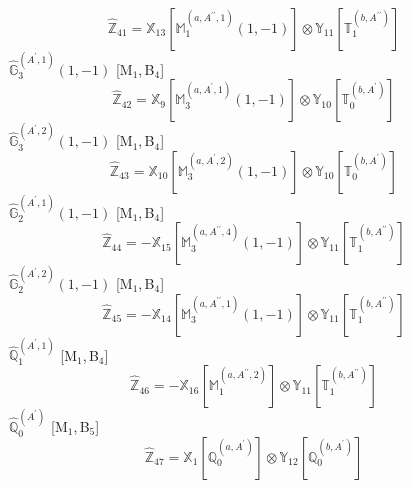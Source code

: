 \documentclass[fleqn,10pt,landscape]{article}
\begin{document}
\begin{itemize}
\begin{dmath*}
\hat{\mathbb{Z}}_{41}=\mathbb{X}_{13}[\mathbb{M}_{1}^{(a,A^{\prime\prime},1)}(1,-1)] \otimes\mathbb{Y}_{11}[\mathbb{T}_{1}^{(b,A^{\prime\prime})}]
\end{dmath*}
\vspace{4mm}
\noindent {} $\,\,\,\hat{\mathbb{G}}_{3}^{(A^{\prime},1)}(1,-1)$ [M$_{1}$,\,B$_{4}$]
\begin{dmath*}
\hat{\mathbb{Z}}_{42}=\mathbb{X}_{9}[\mathbb{M}_{3}^{(a,A^{\prime},1)}(1,-1)] \otimes\mathbb{Y}_{10}[\mathbb{T}_{0}^{(b,A^{\prime})}]
\end{dmath*}
\vspace{4mm}
\noindent {} $\,\,\,\hat{\mathbb{G}}_{3}^{(A^{\prime},2)}(1,-1)$ [M$_{1}$,\,B$_{4}$]
\begin{dmath*}
\hat{\mathbb{Z}}_{43}=\mathbb{X}_{10}[\mathbb{M}_{3}^{(a,A^{\prime},2)}(1,-1)] \otimes\mathbb{Y}_{10}[\mathbb{T}_{0}^{(b,A^{\prime})}]
\end{dmath*}
\vspace{4mm}
\noindent {} $\,\,\,\hat{\mathbb{G}}_{2}^{(A^{\prime},1)}(1,-1)$ [M$_{1}$,\,B$_{4}$]
\begin{dmath*}
\hat{\mathbb{Z}}_{44}=- \mathbb{X}_{15}[\mathbb{M}_{3}^{(a,A^{\prime\prime},4)}(1,-1)] \otimes\mathbb{Y}_{11}[\mathbb{T}_{1}^{(b,A^{\prime\prime})}]
\end{dmath*}
\vspace{4mm}
\noindent {} $\,\,\,\hat{\mathbb{G}}_{2}^{(A^{\prime},2)}(1,-1)$ [M$_{1}$,\,B$_{4}$]
\begin{dmath*}
\hat{\mathbb{Z}}_{45}=- \mathbb{X}_{14}[\mathbb{M}_{3}^{(a,A^{\prime\prime},1)}(1,-1)] \otimes\mathbb{Y}_{11}[\mathbb{T}_{1}^{(b,A^{\prime\prime})}]
\end{dmath*}
\vspace{4mm}
\noindent {} $\,\,\,\hat{\mathbb{Q}}_{1}^{(A^{\prime},1)}$ [M$_{1}$,\,B$_{4}$]
\begin{dmath*}
\hat{\mathbb{Z}}_{46}=- \mathbb{X}_{16}[\mathbb{M}_{1}^{(a,A^{\prime\prime},2)}] \otimes\mathbb{Y}_{11}[\mathbb{T}_{1}^{(b,A^{\prime\prime})}]
\end{dmath*}
\vspace{4mm}
\noindent {} $\,\,\,\hat{\mathbb{Q}}_{0}^{(A^{\prime})}$ [M$_{1}$,\,B$_{5}$]
\begin{dmath*}
\hat{\mathbb{Z}}_{47}=\mathbb{X}_{1}[\mathbb{Q}_{0}^{(a,A^{\prime})}] \otimes\mathbb{Y}_{12}[\mathbb{Q}_{0}^{(b,A^{\prime})}]
\end{dmath*}
\vspace{4mm}

\end{itemize}
\end{document}
